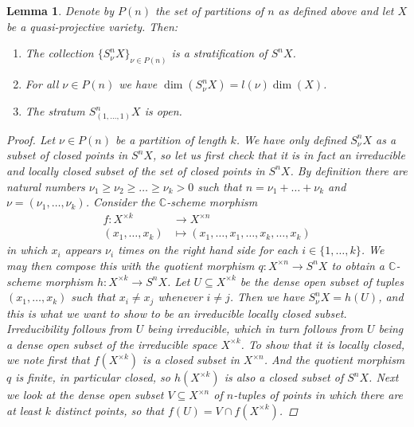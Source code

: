 \documentclass[12pt,a4paper]{amsart}
\theoremstyle{plain}
\newtheorem{lm}[thm]{Lemma}
\theoremstyle{definition}
\theoremstyle{remark}
\begin{document}
\begin{lm}\label{lm:stratification}
  Denote by $P(n)$ the set of partitions of $n$ as defined above and let $X$ be a quasi-projective variety.
  Then:
  \begin{enumerate}[label=(\roman*)]
    \item The collection $\{ S_{\nu}^{n}X \}_{\nu \in P(n)}$ is a stratification of $S^{n}X$.
    \item For all $\nu \in P(n)$ we have $\dim(S_{\nu}^{n}X) = l(\nu)\dim(X)$.
    \item The stratum $S_{(1,\ldots,1)}^{n}X$ is open.
  \end{enumerate} 
  \begin{proof}
    Let $\nu \in P(n)$ be a partition of length $k$.
    We have only defined $S^{n}_{\nu}X$ as a subset of closed points in $S^{n}X$, so let us first check that it is in fact an irreducible and locally closed subset of the set of closed points in $S^{n}X$.
    By definition there are natural numbers $\nu_{1} \geq \nu_{2} \geq \ldots \geq \nu_{k} > 0$ such that $n = \nu_{1} + \ldots + \nu_{k}$ and $\nu = (\nu_{1},\ldots, \nu_{k})$.
    Consider the $\mathbb{C}$-scheme morphism
    \begin{align*}
      f \colon X^{\times k} & \longrightarrow X^{\times n} \\
      (x_{1}, \ldots, x_{k}) & \longmapsto (x_{1}, \ldots, x_{1}, \ldots, x_{k}, \ldots, x_{k})
    \end{align*}
    in which $x_{i}$ appears $\nu_{i}$ times on the right hand side for each $i \in \{1, \ldots, k \}$.
    We may then compose this with the quotient morphism $q \colon X^{\times n} \to S^{n}X$ to obtain a $\mathbb{C}$-scheme morphism $h \colon X^{\times k} \to S^{n}X$.
    Let $U \subseteq X^{\times k}$ be the dense open subset of tuples $(x_{1}, \ldots, x_{k})$ such that $x_{i} \neq x_{j}$ whenever $i \neq j$.
    Then we have $S^{n}_{\nu}X = h(U)$, and this is what we want to show to be an irreducible locally closed subset.
    Irreducibility follows from $U$ being irreducible, which in turn follows from $U$ being a dense open subset of the irreducible space $X^{\times k}$.
    To show that it is locally closed, we note first that $f(X^{\times k})$ is a closed subset in $X^{\times n}$.
    And the quotient morphism $q$ is finite, in particular closed, so $h(X^{\times k})$ is also a closed subset of $S^{n}X$.
    Next we look at the dense open subset $V \subseteq X^{\times n}$ of $n$-tuples of points in which there are at least $k$ distinct points, so that $f(U) = V \cap f(X^{\times k})$.

\end{proof}
\end{lm}
\end{document}
